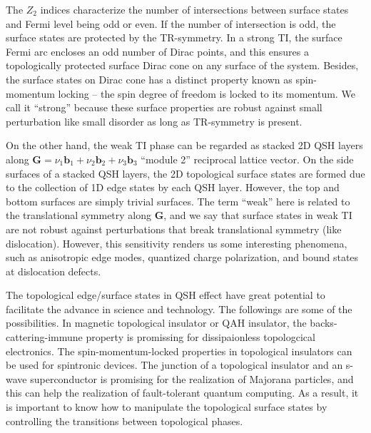 The $Z_2$ indices characterize the number of intersections between surface states and Fermi level being odd or even. If the number of intersection is odd, the surface states are protected by the TR-symmetry. In a strong TI, the surface Fermi arc encloses an odd number of Dirac points, and this ensures a topologically protected surface Dirac cone on any surface of the system. Besides, the surface states on Dirac cone has a distinct property known as spin-momentum locking -- the spin degree of freedom is locked to its momentum. We call it ``strong'' because these surface properties are robust against small perturbation like small disorder as long as TR-symmetry is present.

On the other hand, the weak TI phase can be regarded as stacked 2D QSH layers along $\textbf{G} = \nu_1 \textbf{b}_1 + \nu_2 \textbf{b}_2 + \nu_3 \textbf{b}_3$ “module 2” reciprocal lattice vector. 
On the side surfaces of a stacked QSH layers, the 2D topological surface states are formed due to the collection of 1D edge states by each QSH layer. However, the top and bottom surfaces are simply trivial surfaces. The term ``weak'' here is related to the translational symmetry along $\textbf{G}$, and we say that surface states in weak TI are not robust against perturbations that break translational symmetry (like dislocation). However, this sensitivity renders us some interesting phenomena, such as anisotropic edge modes, quantized charge polarization, and bound states at dislocation defects.

The topological edge/surface states in QSH effect have great potential to facilitate the advance in science and technology. The followings are some of the possibilities. In magnetic topological insulator or QAH insulator, the backs-cattering-immune property is promissing for dissipaionless topologcical electronics. The spin-momentum-locked properties in topological insulators can be used for spintronic devices. The junction of a topological insulator and an s-wave superconductor is promising for the realization of Majorana particles, and this can help the realization of fault-tolerant quantum computing. As a result, it is important to know how to manipulate the topological surface states by controlling the transitions between topological phases.




	
    \pagebreak
    
